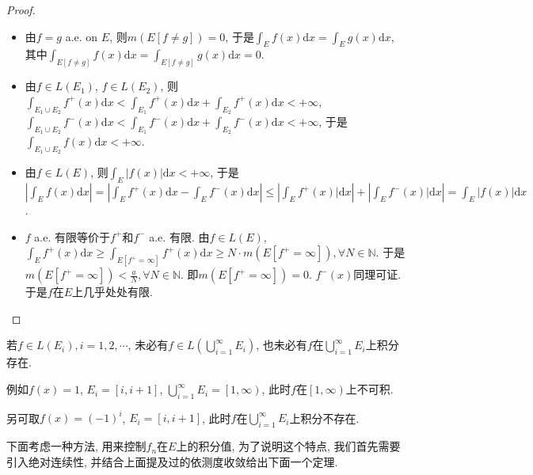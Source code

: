 \documentclass[theorem=false,mathfont=none,openany,sub3section]{easybook}
\begin{document}
\begin{proof}
  \begin{itemize}
    \item 由$f=g$ a.e. on $E$, 则$m(E[f\ne g])=0$, 于是$\int_{E}f(x)\mathrm{d}x=\int_{E}g(x)\mathrm{d}x$, 其中$\int_{E[f\ne g]}f(x)\mathrm{d}x=\int_{E[f\ne g]}g(x)\mathrm{d}x=0$.\par
    \item 由$f\in L(E_1)$, $f\in L(E_2)$, 则$\int_{E_1\cup E_2}f^{+}(x)\mathrm{d}x<\int_{E_1}f^{+}(x)\mathrm{d}x+\int_{E_2}f^{+}(x)\mathrm{d}x<+\infty$, $\int_{E_1\cup E_2}f^{-}(x)\mathrm{d}x<\int_{E_1}f^{-}(x)\mathrm{d}x+\int_{E_2}f^{-}(x)\mathrm{d}x<+\infty$, 于是$\int_{E_1\cup E_2}f(x)\mathrm{d}x<+\infty$.\par
    \item 由$f\in L(E)$, 则$\int_{E}|f(x)|\mathrm{d}x<+\infty$, 于是$\left|\int_{E}f(x)\mathrm{d}x\right|=\left|\int_{E}f^{+}(x)\mathrm{d}x-\int_{E}f^{-}(x)\mathrm{d}x\right|\leqslant \left|\int_{E}f^{+}(x)|\mathrm{d}x\right|+\left|\int_{E}f^{-}(x)|\mathrm{d}x\right|=\int_{E}\left|f(x)\right|\mathrm{d}x$.\par
    \item $f$ a.e. 有限等价于$f^{+}$和$f^{-}$ a.e. 有限. 由$f\in L(E)$, $\int_{E}f^{+}(x)\mathrm{d}x\geqslant \int_{E[f^{+}=\infty]}f^{+}(x)\mathrm{d}x\geqslant N\cdot m(E[f^{+}=\infty]), \forall N \in \mathbb{N}$. 于是$m(E[f^{+}=\infty])<\frac{a}{N}, \forall N\in \mathbb{N}$. 即$m(E[f^{+}=\infty])=0$. $f^{-}(x)$同理可证. 于是$f$在$E$上几乎处处有限.\par
  \end{itemize}
\end{proof}

\begin{remark}
  若$f\in L(E_i), i=1,2,\cdots$, 未必有$f\in L\left(\bigcup_{i=1}^{\infty}E_i\right)$, 也未必有$f$在$\bigcup_{i=1}^{\infty}E_i$上积分存在.\par
  例如$f(x)=1$, $E_i=[i,i+1]$, $\bigcup_{i=1}^{\infty}E_i=\left[1\right.\left.,\infty\right)$, 此时$f$在$\left[1\right.\left.,\infty\right)$上不可积.\par
  另可取$f(x)=(-1)^{i}$, $E_i=[i,i+1]$, 此时$f$在$\bigcup_{i=1}^{\infty}E_i$上积分不存在.\par
\end{remark}

下面考虑一种方法, 用来控制$f_n$在$E$上的积分值, 为了说明这个特点, 我们首先需要引入绝对连续性, 并结合上面提及过的依测度收敛给出下面一个定理.\par
\end{document}
